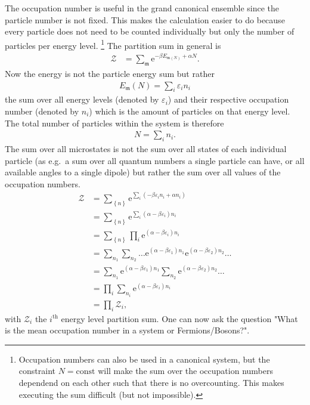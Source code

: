 \documentclass[a4paper,10pt]{article}
\numberwithin{equation}{section}
\begin{document}
\begin{multicols}{2}
The occupation number is useful in the grand canonical ensemble since the particle number is not fixed.
This makes the calculation easier to do because every particle does not need to be counted individually but only the number of particles per energy level.
\footnote{Occupation numbers can also be used in a canonical system, but the constraint $N=\text{const}$ will make the sum over the occupation numbers dependend on each other such that there is no overcounting.
This makes executing the sum difficult (but not impossible).}
The partition sum in general is
\begin{align} 
  \mathcal{Z} &= \sum_{\mathfrak{m}}^{}\text{e}^{-\beta E_{\mathfrak{m}(N)}+\alpha N}
.\end{align} 
Now the energy is not the particle energy sum but rather
\begin{align} 
  E_\mathfrak{m}(N)=\sum_{i}^{}\varepsilon _i n_i
\end{align} 
the sum over all energy levels (denoted by $\varepsilon _i$) and their respective occupation number (denoted by $n_i$) which is the amount of particles on that energy level.
The total number of particles within the system is therefore
\begin{align} 
  N=\sum_{i}^{}n_i
.\end{align} 
The sum over all microstates is not the sum over all states of each individual particle (as e.g.\ a sum over all quantum numbers a single particle can have, or all available angles to a single dipole) but rather the sum over all values of the occupation numbers.
\begin{align} 
  \mathcal{Z} &= \sum_{ \left\{n\right\}}^{}\text{e}^{\sum_{i}^{}(-\beta \varepsilon _i n_i+\alpha n_i)}\\
              &= \sum_{ \left\{n\right\}}^{}\text{e}^{\sum_{i}^{}(\alpha -\beta \varepsilon _i)n_i}\\
              &= \sum_{ \left\{n\right\}}^{}\prod_{i}^{}\text{e}^{(\alpha -\beta \varepsilon _i)n_i}\\
              &= \sum_{n_1}^{}\sum_{n_2}^{}\hdots \text{e}^{(\alpha -\beta \varepsilon _1)n_1}\text{e}^{(\alpha -\beta \varepsilon _2)n_2}\hdots \\
              &= \sum_{n_1}^{}\text{e}^{(\alpha -\beta \varepsilon _1)n_1}\sum_{n_2}^{}\text{e}^{(\alpha -\beta \varepsilon _2)n_2}\hdots \\
              &= \prod_{i}^{}\sum_{n_i}^{}\text{e}^{(\alpha -\beta \varepsilon _i)n_i}\\
              &= \prod_{i}^{}\mathcal{Z}_i
,\end{align} 
with $\mathcal{Z}_i$ the $i^{\text{th}}$ energy level partition sum.
One can now ask the question "What is the mean occupation number in a system or Fermions/Bosons?".


\end{multicols}
\end{document}
